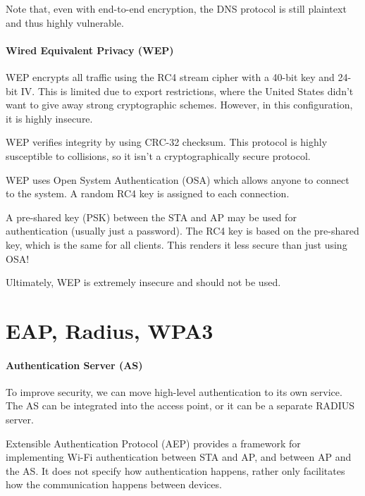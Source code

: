 Note that, even with end-to-end encryption, the DNS protocol is still plaintext and thus highly vulnerable.

\paragraph{Wired Equivalent Privacy (WEP)} WEP encrypts all traffic using the RC4 stream cipher with a 40-bit key and 24-bit IV. This is limited due to export restrictions, where the United States didn't want to give away strong cryptographic schemes. However, in this configuration, it is highly insecure.

WEP verifies integrity by using CRC-32 checksum. This protocol is highly susceptible to collisions, so it isn't a cryptographically secure protocol.

WEP uses Open System Authentication (OSA) which allows anyone to connect to the system. A random RC4 key is assigned to each connection.

A pre-shared key (PSK) between the STA and AP may be used for authentication (usually just a password). The RC4 key is based on the pre-shared key, which is the same for all clients. This renders it less secure than just using OSA!

\begin{notebox}
    Ultimately, WEP is extremely insecure and should not be used.
\end{notebox}

\section{EAP, Radius, WPA3}



\paragraph{Authentication Server (AS)} To improve security, we can move high-level authentication to its own service. The AS can be integrated into the access point, or it can be a separate RADIUS server.

\begin{dfnbox}{Extensible Authentication Protocol (AEP)}{}
     provides a framework for implementing Wi-Fi authentication between STA and AP, and between AP and the AS. It does not specify how authentication happens, rather only facilitates how the communication happens between devices.
\end{dfnbox}

